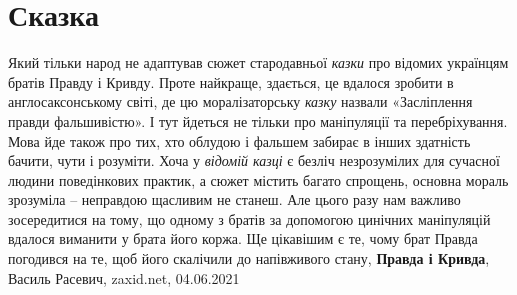  
 
 
 
 
\chapter{Сказка}
\label{sec:slova.skazka}

Який тільки народ не адаптував сюжет стародавньої \emph{казки} про відомих
українцям братів Правду і Кривду. Проте найкраще, здається, це вдалося зробити
в англосаксонському світі, де цю моралізаторську \emph{казку} назвали
«Засліплення правди фальшивістю». І тут йдеться не тільки про маніпуляції та
перебріхування.  Мова йде також про тих, хто облудою і фальшем забирає в інших
здатність бачити, чути і розуміти. Хоча у \emph{відомій казці} є безліч
незрозумілих для сучасної людини поведінкових практик, а сюжет містить багато
спрощень, основна мораль зрозуміла – неправдою щасливим не станеш. Але цього
разу нам важливо зосередитися на тому, що одному з братів за допомогою цинічних
маніпуляцій вдалося виманити у брата його коржа. Ще цікавішим є те, чому брат
Правда погодився на те, щоб його скалічили до напівживого стану,
\textbf{Правда і Кривда}, Василь Расевич, zaxid.net, 04.06.2021

